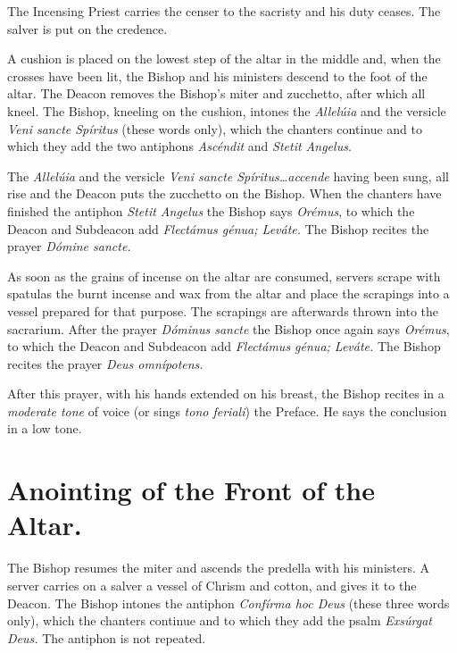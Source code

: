 \documentclass[letterpaper]{report}
\begin{document}
{    The Incensing Priest carries the censer to the sacristy and his duty
    ceases. The salver is put on the credence.

    \rubric A cushion is placed on the lowest step of the altar in the middle
    and, when the crosses have been lit, the Bishop and his ministers descend
    to the foot of the altar. The Deacon removes the Bishop's miter and
    zucchetto, after which all kneel. The Bishop, kneeling on the cushion,
    intones the \textit{Allel\'uia} and the versicle \textit{Veni sancte
    Spíritus} (these words only), which the chanters continue and to which they
    add the two antiphons \textit{Ascéndit} and \textit{Stetit Angelus}.

    \rubric The \textit{Allel\'uia} and the versicle \textit{Veni sancte
    Spíritus\dots accende} having been sung, all rise and the Deacon puts the
    zucchetto on the Bishop. When the chanters have finished the antiphon
    \textit{Stetit Angelus} the Bishop says \textit{Orémus}, to which the Deacon
    and Subdeacon add \textit{Flectámus génua; Leváte.} The Bishop recites the
    prayer \textit{Dómine sancte.}

    \rubric As soon as the grains of incense on the altar are consumed, servers
    scrape with spatulas the burnt incense and wax from the altar and place the
    scrapings into a vessel prepared for that purpose. The scrapings are afterwards
    thrown into the sacrarium. After the prayer \textit{Dóminus sancte} the Bishop
    once again says \textit{Orémus}, to which the Deacon and Subdeacon add
    \textit{Flectámus génua; Leváte.} The Bishop recites the prayer \textit{Deus
    omnípotens.}

    \rubric After this prayer, with his hands extended on his breast, the Bishop
    recites in a \textit{moderate tone} of voice (or sings \textit{tono feriali})
    the Preface. He says the conclusion in a low tone.

    \section{Anointing of the Front of the Altar.}

    \rubric The Bishop resumes the miter and ascends the predella with his
    ministers. A server carries on a salver a vessel of Chrism and cotton, and
    gives it to the Deacon. The Bishop intones the antiphon \textit{Confírma
    hoc Deus} (these three words only), which the chanters continue and to
    which they add the psalm \textit{Exsúrgat Deus.} The antiphon is not
    repeated.

}
\end{document}
